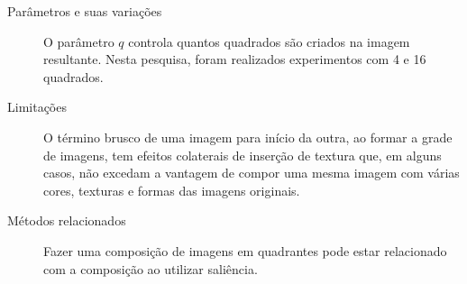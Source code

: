 \begin{description}
  \item[Parâmetros e suas variações] O parâmetro $q$ controla quantos quadrados são criados na imagem resultante. Nesta pesquisa, foram realizados experimentos com 4 e 16 quadrados.

  \item[Limitações] O término brusco de uma imagem para início da outra, ao formar a grade de imagens, tem efeitos colaterais de inserção de textura que, em alguns casos, não excedam a vantagem de compor uma mesma imagem com várias cores, texturas e formas das imagens originais.

  \item[Métodos relacionados] Fazer uma composição de imagens em quadrantes pode estar relacionado com a composição ao utilizar saliência.

\end{description}
%

